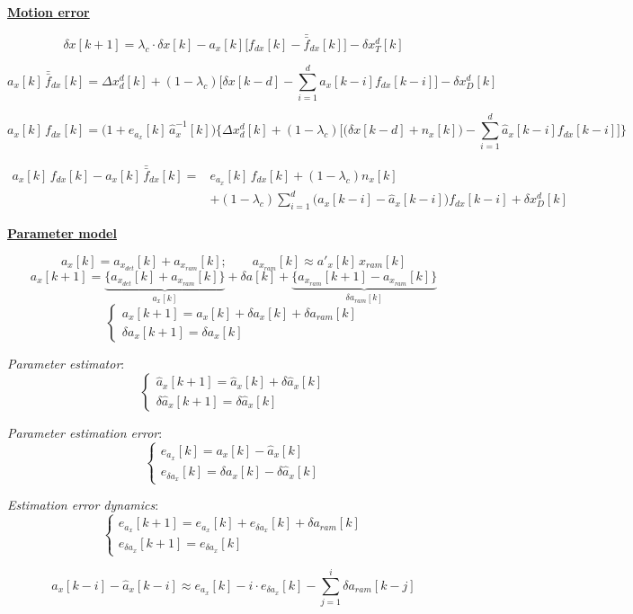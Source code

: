 \documentclass[11pt,a4paper]{ctexart}
\newcommand{\lc}{\lambda_c}
\newcommand{\hd}[1]{\par\medskip\noindent\underline{\textbf{#1}}\par\nobreak\vspace{0.2ex}}
\begin{document}
\hd{Motion error}
\[ \delta x[k+1] = \lc \cdot \delta x[k] - a_x[k]\big[ f_{dx}[k] - \bar{\bar f}_{dx}[k] \big] - \delta x_T^{d}[k] \]

\[ a_x[k]\,\bar{\bar f}_{dx}[k] = \Delta x_d^{d}[k] + (1-\lc)\Big[\delta x[k-d] - \textstyle\sum_{i=1}^{d} a_x[k-i] f_{dx}[k-i]\Big] - \delta x_D^{d}[k] \]

\[
a_x[k]\, f_{dx}[k] = \big(1 + e_{a_x}[k]\,\hat a_x^{-1}[k]\big)\Big\{ \Delta x_d^{d}[k]
+ (1-\lc)\Big[\big(\delta x[k-d] + n_x[k]\big) - \textstyle\sum_{i=1}^{d}\hat a_x[k-i] f_{dx}[k-i]\Big] \Big\}
\]

\[
\begin{aligned}
a_x[k]\, f_{dx}[k] - a_x[k]\,\bar{\bar f}_{dx}[k] ={}& e_{a_x}[k]\, f_{dx}[k] + (1-\lc) n_x[k] \\
&+ (1-\lc)\textstyle\sum_{i=1}^{d}\big(a_x[k-i] - \hat a_x[k-i]\big) f_{dx}[k-i] + \delta x_D^{d}[k]
\end{aligned}
\]

\hd{Parameter model}
\[ a_x[k] = a_{x_{det}}[k] + a_{x_{ram}}[k]; \qquad a_{x_{ram}}[k] \approx a'_x[k]\, x_{ram}[k] \]
\[
a_x[k+1] = \underbrace{\big\{ a_{x_{det}}[k] + a_{x_{ram}}[k] \big\}}_{a_x[k]} + \delta a[k]
+ \underbrace{\big\{ a_{x_{ram}}[k+1] - a_{x_{ram}}[k] \big\}}_{\delta a_{ram}[k]}
\]
\[ \begin{cases} a_x[k+1] = a_x[k] + \delta a_x[k] + \delta a_{ram}[k] \\ \delta a_x[k+1] = \delta a_x[k] \end{cases} \]

\textit{Parameter estimator}:
\[ \begin{cases} \hat a_x[k+1] = \hat a_x[k] + \delta \hat a_x[k] \\ \delta \hat a_x[k+1] = \delta \hat a_x[k] \end{cases} \]

\textit{Parameter estimation error}:
\[ \begin{cases} e_{a_x}[k] = a_x[k] - \hat a_x[k] \\ e_{\delta a_x}[k] = \delta a_x[k] - \delta \hat a_x[k] \end{cases} \]

\textit{Estimation error dynamics}:
\[ \begin{cases} e_{a_x}[k+1] = e_{a_x}[k] + e_{\delta a_x}[k] + \delta a_{ram}[k] \\ e_{\delta a_x}[k+1] = e_{\delta a_x}[k] \end{cases} \]

\newpage
\[ a_x[k-i] - \hat a_x[k-i] \approx e_{a_x}[k] - i\cdot e_{\delta a_x}[k] - \sum_{j=1}^{i}\delta a_{ram}[k-j] \]
\end{document}
